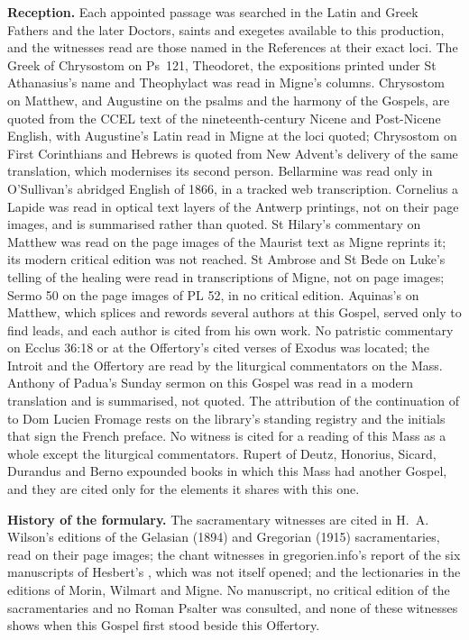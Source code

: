 {\textbf{Reception.} Each appointed passage was searched in the Latin and Greek
Fathers and the later Doctors, saints and exegetes available to this
production, and the witnesses read are those named in the References at their
exact loci. The Greek of Chrysostom on Ps~121, Theodoret, the expositions
printed under St Athanasius's name and Theophylact was read in Migne's columns.
Chrysostom on Matthew, and Augustine on the psalms and the harmony of the
Gospels, are quoted from the CCEL text of the nineteenth-century Nicene and
Post-Nicene English, with Augustine's Latin read in Migne at the loci quoted;
Chrysostom on First Corinthians and Hebrews is quoted from New Advent's delivery
of the same translation, which modernises its second person.
Bellarmine was read only in O'Sullivan's abridged English of 1866, in a tracked
web transcription. Cornelius a Lapide was read in optical text layers of the
Antwerp printings, not on their page images, and is summarised rather than
quoted. St Hilary's commentary on Matthew was read on the page images of the
Maurist text as Migne reprints it; its modern critical edition was not reached.
St Ambrose and St Bede on Luke's telling of the healing were read in
transcriptions of Migne, not on page images; Sermo 50 on the page images of
PL 52, in no critical edition. Aquinas's  on
Matthew, which splices and rewords several authors at this Gospel, served only
to find leads, and each author is cited from his own work. No patristic commentary on Ecclus 36:18 or at the Offertory's cited
verses of Exodus was located; the Introit and the Offertory are read by the
liturgical commentators on the Mass. Anthony of Padua's
Sunday sermon on this Gospel was read in a modern translation and is summarised,
not quoted. The attribution of the continuation of 
to Dom Lucien Fromage rests on the library's standing registry and the
initials that sign the French preface. No witness is cited for a reading of this
Mass as a whole except the liturgical commentators. Rupert of Deutz, Honorius,
Sicard, Durandus and Berno expounded books in which this Mass had another
Gospel, and they are cited only for the elements it shares with this one.

\textbf{History of the formulary.} The sacramentary witnesses are cited in H.~A.
Wilson's editions of the Gelasian (1894) and Gregorian (1915) sacramentaries,
read on their page images; the chant witnesses in gregorien.info's report of the
six manuscripts of Hesbert's , which was
not itself opened; and the lectionaries in the editions of Morin, Wilmart and
Migne. No manuscript, no critical edition of the sacramentaries and no Roman
Psalter was consulted, and none of these witnesses shows when this Gospel first
stood beside this Offertory.

}
